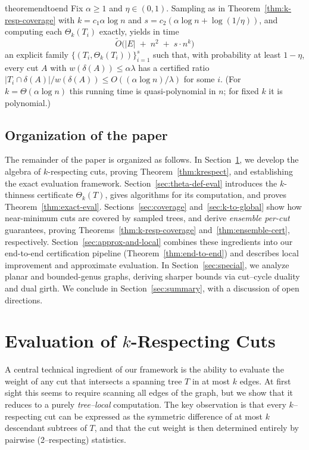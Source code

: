 \documentclass[11pt,letterpaper]{article}
\begin{document}
\begin{restatable}{theorem}{endtoend}
\label{thm:end-to-end}
Fix $\alpha\ge 1$ and $\eta\in(0,1)$. Sampling as in Theorem~\ref{thm:k-resp-coverage} with
$k=c_1\alpha\log n$ and $s=c_2(\alpha\log n+\log(1/\eta))$, and computing each $\Theta_k(T_i)$ exactly, yields in time
\[
\tilde O\!\big(|E| \;+\; n^2 \;+\; s \cdot n^k\big)
\]
an explicit family $\{(T_i,\Theta_k(T_i))\}_{i=1}^s$ such that, with probability at least $1-\eta$,
every cut $A$ with $w(\delta(A))\le \alpha\lambda$ has a certified ratio
$|T_i\cap\delta(A)|/w(\delta(A))\le O((\alpha\log n)/\lambda)$ for some $i$.
(For $k=\Theta(\alpha\log n)$ this running time is quasi-polynomial in $n$; for fixed $k$ it is polynomial.)
\end{restatable}

\subsection{Organization of the paper}

The remainder of the paper is organized as follows.  
In Section~\ref{sec:krespect}, we develop the algebra of
$k$-respecting cuts, proving Theorem~\ref{thm:krespect}, and
establishing the exact evaluation framework.
Section~\ref{sec:theta-def-eval} introduces the
$k$-thinness certificate $\Theta_k(T)$, gives algorithms for
its computation, and proves Theorem~\ref{thm:exact-eval}.
Sections~\ref{sec:coverage} and~\ref{sec:k-to-global} show how near-minimum cuts
are covered by sampled trees, and derive \emph{ensemble per-cut} guarantees,
proving Theorems~\ref{thm:k-resp-coverage}
and~\ref{thm:ensemble-cert}, respectively.
Section~\ref{sec:approx-and-local} combines these ingredients into
our end-to-end certification pipeline (Theorem~\ref{thm:end-to-end}) and
describes local improvement and approximate evaluation.
In Section~\ref{sec:special}, we analyze planar and bounded-genus
graphs, deriving sharper bounds via cut--cycle duality and dual girth.
We conclude in Section~\ref{sec:summary}, with a discussion of
open directions.

\section{Evaluation of $k$-Respecting Cuts}
\label{sec:krespect}

A central technical ingredient of our framework is the ability to evaluate
the weight of any cut that intersects a spanning tree $T$ in at most $k$ edges.
At first sight this seems to require scanning all edges of the graph,
but we show that it reduces to a purely \emph{tree--local} computation.
The key observation is that every $k$--respecting cut can be expressed
as the symmetric difference of at most $k$ descendant subtrees of $T$,
and that the cut weight is then determined entirely by
pairwise (2--respecting) statistics.
\end{document}
